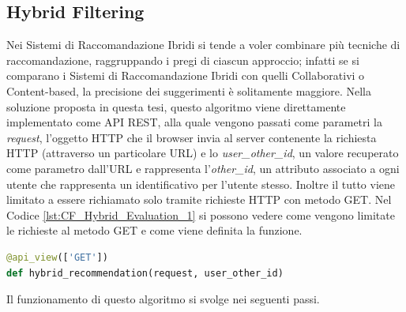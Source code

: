 \subsection{Hybrid Filtering} 
Nei Sistemi di Raccomandazione Ibridi si tende a voler combinare più tecniche di raccomandazione, raggruppando i 
pregi di ciascun approccio; infatti se si comparano i Sistemi di Raccomandazione Ibridi con quelli Collaborativi o 
Content-based, la precisione dei suggerimenti è solitamente maggiore.\hfill\break
Nella soluzione proposta in questa tesi, questo algoritmo viene direttamente implementato come API REST, alla quale vengono 
passati come parametri la \textit{request}, l'oggetto HTTP che il browser invia al server contenente la richiesta HTTP 
(attraverso un particolare URL) e lo \textit{user\_other\_id}, un valore recuperato come parametro dall'URL e rappresenta 
l'\textit{other\_id}, un attributo associato a ogni utente che rappresenta un identificativo per l'utente stesso. Inoltre il 
tutto viene limitato a essere richiamato solo tramite richieste HTTP con metodo GET.\hfill\break
Nel Codice \ref{lst:CF_Hybrid_Evaluation_1} si possono vedere come vengono limitate le richieste al metodo GET e come 
viene definita la funzione.
\begin{lstlisting}[language=Python, label=lst:CF_Hybrid_Evaluation_1, caption={\ }]
@api_view(['GET'])
def hybrid_recommendation(request, user_other_id)
\end{lstlisting} 
%
Il funzionamento di questo algoritmo si svolge nei seguenti passi.
